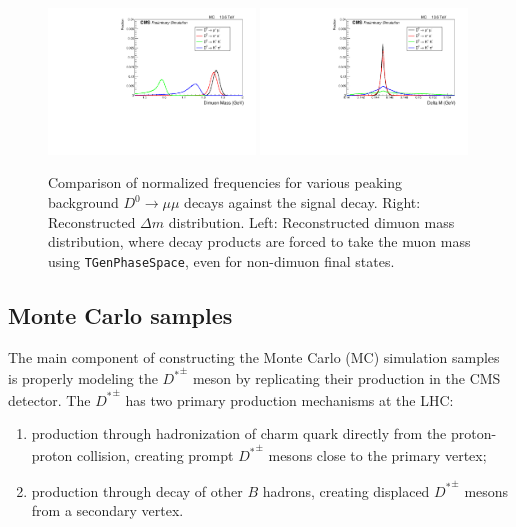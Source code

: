 \begin{figure}[htp]
    \begin{center}
      \includegraphics[width=0.49\textwidth]{figures/chapter4/reconstructed_D0_mass.pdf}
      \includegraphics[width=0.49\textwidth]{figures/chapter4/reconstructed_delta_m.pdf}\\
    \end{center}
    \caption{
      Comparison of normalized frequencies for various peaking background $D^0 \to \mu \mu$ decays against the signal decay.
      Right: Reconstructed $\Delta m$ distribution.
      Left: Reconstructed dimuon mass distribution, where decay products are forced to take the muon mass using \texttt{TGenPhaseSpace}, even for non-dimuon final states.
    }
    \label{fig:reconstructed_D0_comparison}
  \end{figure}
  
  


\subsection{Monte Carlo samples}

The main component of constructing the Monte Carlo (MC) simulation samples is properly modeling the ${D^*}^\pm$ meson by replicating their production in the CMS detector. The ${D^*}^\pm$ has two primary production mechanisms at the LHC:
\begin{enumerate}
    \item production through hadronization of charm quark directly from the proton-proton collision, creating prompt ${D^*}^\pm$ mesons close to the primary vertex; 
    \item production through decay of other $B$ hadrons, creating displaced ${D^*}^\pm$ mesons from a secondary vertex.
\end{enumerate}

